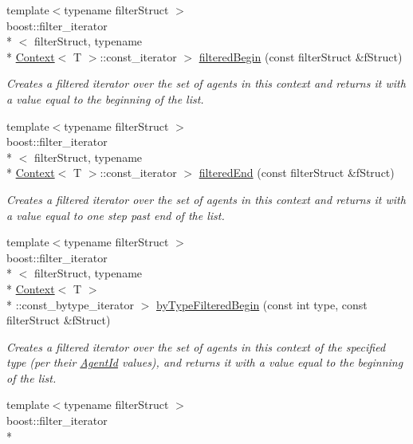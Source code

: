 \begin{DoxyCompactItemize}
{\footnotesize template$<$typename filter\-Struct $>$ }\\boost\-::filter\-\_\-iterator\\*
$<$ filter\-Struct, typename \\*
\hyperlink{classrepast_1_1_context}{Context}$<$ T $>$\-::const\-\_\-iterator $>$ \hyperlink{classrepast_1_1_context_ab54a094afb5834a34be46e732465ff30}{filtered\-Begin} (const filter\-Struct \&f\-Struct)
\begin{DoxyCompactList}\small\item\em Creates a filtered iterator over the set of agents in this context and returns it with a value equal to the beginning of the list. \end{DoxyCompactList}\item 
{\footnotesize template$<$typename filter\-Struct $>$ }\\boost\-::filter\-\_\-iterator\\*
$<$ filter\-Struct, typename \\*
\hyperlink{classrepast_1_1_context}{Context}$<$ T $>$\-::const\-\_\-iterator $>$ \hyperlink{classrepast_1_1_context_ad12bb3d7e2578bf80ebbd0dd1b1a7ebd}{filtered\-End} (const filter\-Struct \&f\-Struct)
\begin{DoxyCompactList}\small\item\em Creates a filtered iterator over the set of agents in this context and returns it with a value equal to one step past end of the list. \end{DoxyCompactList}\item 
{\footnotesize template$<$typename filter\-Struct $>$ }\\boost\-::filter\-\_\-iterator\\*
$<$ filter\-Struct, typename \\*
\hyperlink{classrepast_1_1_context}{Context}$<$ T $>$\\*
\-::const\-\_\-bytype\-\_\-iterator $>$ \hyperlink{classrepast_1_1_context_aa7abe8aefbda43b0b35fcbd3589b465c}{by\-Type\-Filtered\-Begin} (const int type, const filter\-Struct \&f\-Struct)
\begin{DoxyCompactList}\small\item\em Creates a filtered iterator over the set of agents in this context of the specified type (per their \hyperlink{classrepast_1_1_agent_id}{Agent\-Id} values), and returns it with a value equal to the beginning of the list. \end{DoxyCompactList}\item 
{\footnotesize template$<$typename filter\-Struct $>$ }\\boost\-::filter\-\_\-iterator\\*

\end{DoxyCompactItemize}
